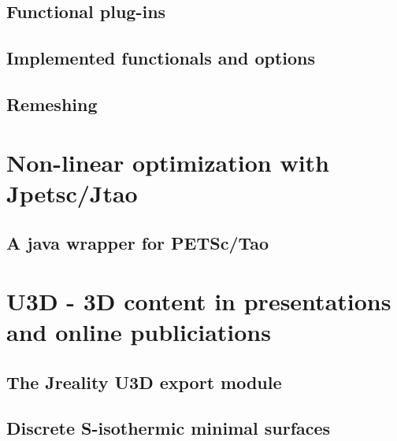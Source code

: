 \subsection{Functional plug-ins}
\subsection{Implemented functionals and options}
\subsection{Remeshing}

\section{Non-linear optimization with {\sc Jpetsc/Jtao}}
\label{sec:jpetsctao}
\subsection{A java wrapper for {\sc PETSc/Tao}}

\section{{\sc U3D} - 3D content in presentations and online publiciations}
\label{sec:u3d}
\subsection{The {\sc Jreality} U3D export module}
\subsection{Discrete S-isothermic minimal surfaces}


